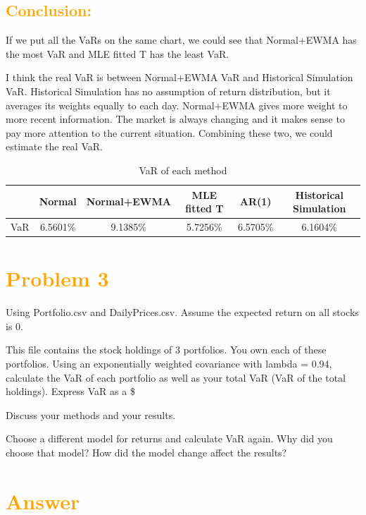 \documentclass[11pt,en]{elegantpaper}
\begin{document}
\subsection*{\textcolor{orange}{Conclusion:}}
If we put all the VaRs on the same chart, we could see that Normal+EWMA has the most VaR and MLE fitted T has the least VaR. 

I think the real VaR is between Normal+EWMA VaR and Historical Simulation VaR. Historical Simulation has no assumption of return distribution, but it averages its weights equally to each day. Normal+EWMA gives more weight to more recent information. The market is always changing and it makes sense to pay more attention to the current situation. Combining these two, we could estimate the real VaR.
\begin{table}[htbp]
    \centering
    \caption{VaR of each method}
    \begin{tabular}{@{}cccccc@{}}
        \toprule
        \textbf{} & \textbf{Normal} & \textbf{Normal+EWMA} & \textbf{MLE fitted T} & \textbf{AR(1)}&\textbf{Historical Simulation}\\
        \midrule
        VaR & 6.5601\%  & 9.1385\% & 5.7256\% & 6.5705\% & 6.1604\% \\
        \bottomrule
    \end{tabular}
\end{table}

\newpage
\section*{\textcolor{orange}{Problem 3}}

Using Portfolio.csv and DailyPrices.csv. Assume the expected return on all stocks is 0.

This file contains the stock holdings of 3 portfolios. You own each of these portfolios. Using an
exponentially weighted covariance with lambda = 0.94, calculate the VaR of each portfolio as
well as your total VaR (VaR of the total holdings). Express VaR as a \$

Discuss your methods and your results.

Choose a different model for returns and calculate VaR again. Why did you choose that model? How did the model change affect the results?


\section*{\textcolor{orange}{Answer}}
\end{document}
